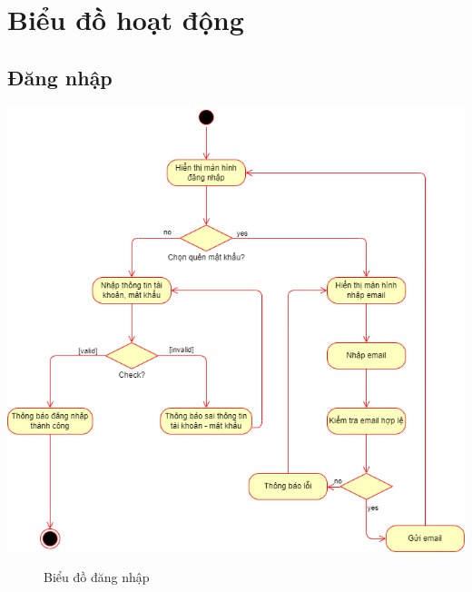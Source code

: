 \section{Biểu đồ hoạt động}
\subsection{Đăng nhập}
\begin{center}
	\includegraphics[width=1.1\textwidth]{../drawio/activity/login.png}
	\begin{figure}[h]
		\centering
		\caption{Biểu đồ đăng nhập}
	\end{figure}
\end{center}
